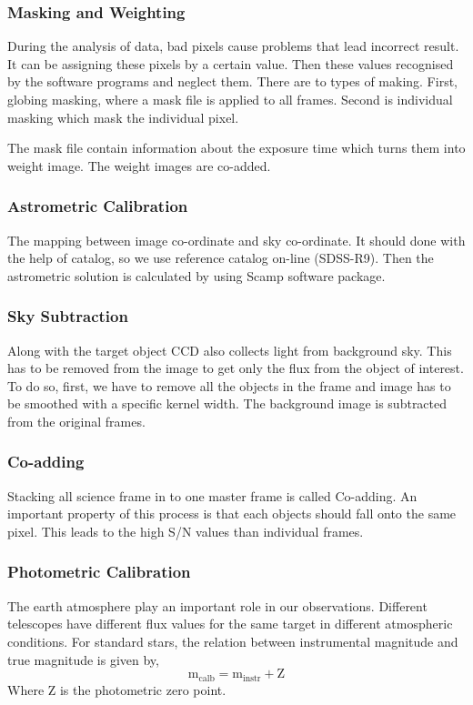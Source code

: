 \subsubsection{Masking and Weighting }
During the analysis of data, bad pixels cause problems that lead incorrect result. It can be assigning these pixels by a certain value. Then these values recognised by the software programs and neglect them. There are to types of making. First, globing masking, where a mask file is applied to all frames. Second is individual masking which mask the individual pixel.

The mask file contain information about the exposure time which turns them into weight image. The weight images are co-added.
\subsubsection{Astrometric Calibration}
The mapping between image co-ordinate and sky co-ordinate. It should done with the help of catalog, so we use reference catalog on-line (SDSS-R9). Then the astrometric solution is calculated by using Scamp software package.
\subsubsection{Sky Subtraction}
Along with the target object CCD also collects light from background sky. This has to be removed from the image to get only the flux from the object of interest. To do so, first, we have to remove all the objects in the frame and image has to be smoothed with a specific kernel width. The background image is subtracted from the original frames.
\subsubsection{Co-adding}
Stacking all science frame in to one master frame is called Co-adding. An important property of this process is that each objects should fall onto the same pixel. This leads to the high S/N values than individual frames.
\subsubsection{Photometric Calibration}
The earth atmosphere play an important role in our observations. Different telescopes have different flux values for the same target in different atmospheric conditions. For standard stars, the relation between instrumental magnitude and true magnitude is given by,
\begin{equation}
\text{m}_{\text{calb}}=\text{m}_{\text{instr}}+ \text{Z}
\end{equation}
Where Z is the photometric zero point.